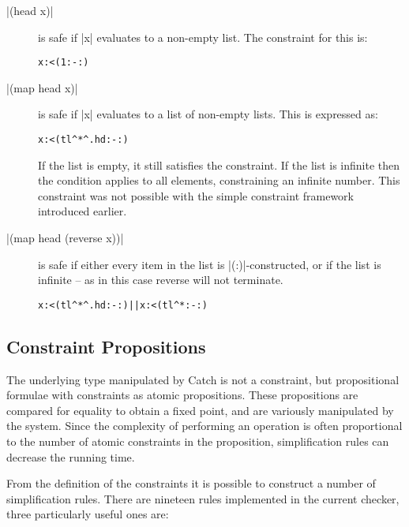 \documentclass[preprint]{sigplanconf}
\newcommand{\C}[1]{\textsf{#1}}
\newenvironment{code}{\begin{alltt}\small}{\end{alltt}}
\begin{document}
\begin{description}
\item[|(head x)|] is safe if |x| evaluates to a non-empty list. The constraint for this is:
    
    \begin{code}
    x :< (1 :- {:})
    \end{code}

\item[|(map head x)|] is safe if |x| evaluates to a list of non-empty lists. This is expressed as:
    
    \begin{code}
    x :< (tl^* ^. hd :- {:})
    \end{code}
    
    If the list is empty, it still satisfies the constraint. If the list is infinite then the condition applies to all elements, constraining an infinite number. This constraint was not possible with the simple constraint framework introduced earlier.

\item[|(map head (reverse x))|] is safe if either every item in the list is |(:)|-constructed, or if the list is infinite -- as in this case \C{reverse} will not terminate.
    
    \begin{code}
    x :< (tl^* ^. hd :- {:}) || x :< (tl^* :- {:})
    \end{code}
\end{description}

\subsection{Constraint Propositions}

The underlying type manipulated by Catch is not a constraint, but propositional formulae with constraints as atomic propositions. These propositions are compared for equality to obtain a fixed point, and are variously manipulated by the system. Since the complexity of performing an operation is often proportional to the number of atomic constraints in the proposition, simplification rules can decrease the running time.

From the definition of the constraints it is possible to construct a number of simplification rules. There are nineteen rules implemented in the current checker, three particularly useful ones are:
\end{document}
